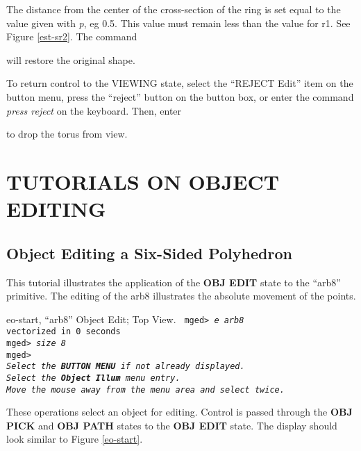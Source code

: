 
The distance from the center of the cross-section of the ring is set equal
to the value given with {\em p}, eg 0.5.
This value must remain less than the value for r1.
See Figure \ref{est-sr2}.
The command


will restore the original shape.

To return control to the VIEWING state, select the ``REJECT Edit''
item on the button menu, press the ``reject'' button on the button box,
or enter the command {\em press reject} on the keyboard.
Then, enter


to drop the torus from view.
\chapter{TUTORIALS ON OBJECT EDITING}

\section{Object Editing a Six-Sided Polyhedron}

This tutorial illustrates the application of the {\bf OBJ EDIT} state to
the ``arb8'' primitive.  The editing of the arb8 illustrates the
absolute movement of the points.

\mfig eo-start, ``arb8'' Object Edit; Top View.
\noindent
{\tt
mged> {\em e arb8}\\
vectorized in 0 seconds\\
mged> {\em size 8}\\
mged>\\
{\em Select the {\bf BUTTON MENU} if not already displayed.} \\
{\em Select the {\bf Object Illum} menu entry.} \\
{\em Move the mouse away from the menu area and select twice.} \\
}

These operations select an object for editing.
Control is passed through the {\bf OBJ PICK} and {\bf OBJ PATH} states
to the {\bf OBJ EDIT} state.  The display should look similar to
Figure \ref{eo-start}.

